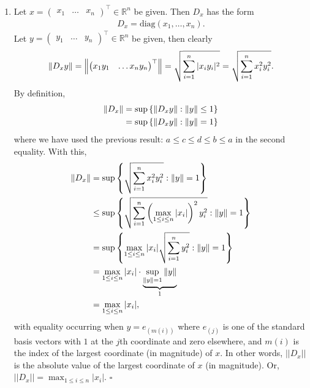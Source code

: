 \documentclass[11pt]{article}
\begin{document}
\begin{enumerate}
	\item  Let ${x} = \begin{pmatrix}
	x_1 & \dots & x_n
	\end{pmatrix}^\top \in \mathbb{R}^n$ be given. Then $D_x$ has the form
	\begin{align*}
	D_x = \text{diag}(x_1,\dots,x_n).
	\end{align*} 
	Let ${y} = \begin{pmatrix}
	y_1 & \dots & y_n
	\end{pmatrix}^\top \in \mathbb{R}^n$ be given, then clearly 
	\begin{align*}
	\norm{ D_xy} = \norm{ \begin{pmatrix}
	x_1 y_1 & \dots x_ny_n
	\end{pmatrix}^\top}= \sqrt{ \sum^n_{i=1}|x_i y_i|^2  }  = \sqrt{\sum^n_{i=1} x_i^2 y_i^2}.
	\end{align*}
	By definition, 
	\begin{align*}
	\norm{ D_x } &= \sup \left\{\norm{ D_x y} : \norm{y} \leq 1 \right\}\nonumber\\
	&= \sup \left\{\norm{D_x y} : \norm{y} = 1\right\}
	\end{align*}
	where we have used the previous result: $a \leq c \leq d \leq b \leq a$ in the second equality. With this,
	\begin{align*}
	\norm{ D_x } &= \sup \left\{\sqrt{\sum^n_{i=1} x_i^2 y_i^2} : \norm{y} = 1\right\}\nonumber\\
	&\leq \sup \left\{ \sqrt{\sum^n_{i=1} \left(\max_{1\leq i \leq n} |x_i|\right)^2  y_i^2} : \norm{y} = 1 \right\}  \nonumber\\
	&= \sup \left\{\max_{1\leq i \leq n} |x_i| \sqrt{\sum^n_{i=1} y_i^2} : \norm{y} = 1 \right\}  \nonumber\\
	&= \max_{1\leq i \leq n} |x_i| \cdot \underbrace{\sup_{\norm{y}=1}\norm{y}}_{1}\nonumber\\
	&= \max_{1\leq i \leq n} |x_i|,
	\end{align*}
	with equality occurring when $y = e_{(m(i))}$ where $e_{(j)}$ is one of the standard basis vectors with $1$ at the $j$th coordinate and zero elsewhere, and $m(i)$ is the index of the largest coordinate (in magnitude) of $x$. In other words, $||D_x||$ is the absolute value of the largest coordinate of $x$ (in magnitude). Or, $||D_x|| = \max_{1\leq i \leq n}|x_i|$. \hfill $\square$
	
	
	

\end{enumerate}
\end{document}
